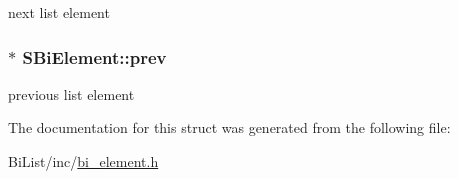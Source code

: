 next list element 

\hypertarget{structSBiElement_ad2e6848f39a13f0608ea5bb1f1f24ef1}{
\subsubsection[{prev}]{$\ast$ {\bf \-S\-Bi\-Element\-::prev}}}\label{structSBiElement_ad2e6848f39a13f0608ea5bb1f1f24ef1}


previous list element 



\-The documentation for this struct was generated from the following file\-:\begin{DoxyCompactItemize}
\item 
\-Bi\-List/inc/\hyperlink{bi__element_8h}{bi\-\_\-element.\-h}\end{DoxyCompactItemize}
